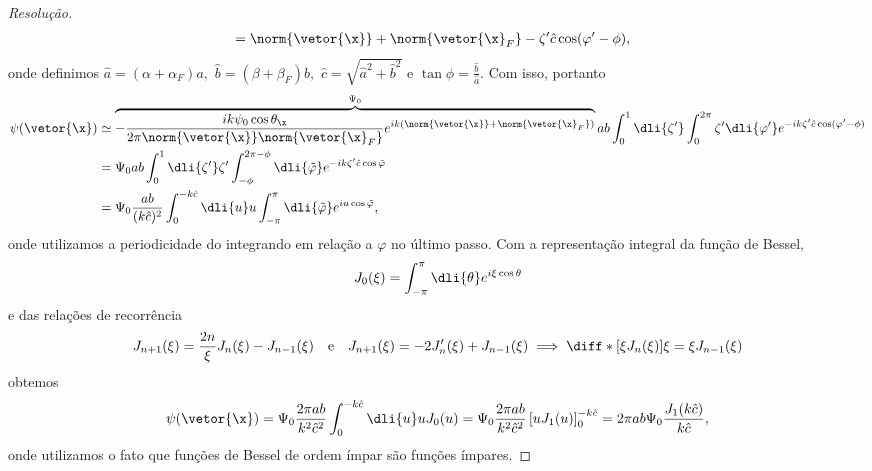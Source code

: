 \begin{proof}[Resolução]
\begin{align*}
                                                      &= \norm{\vetor{\x}} + \norm{\vetor{\x}_F} - \zeta' \hat{c} \cos(\varphi' - \phi),
    \end{align*}
    onde definimos \(\hat{a} = (\alpha + \alpha_F) a,\) \(\hat{b} = (\beta + \beta_F)b,\) \(\hat{c} = \sqrt{\hat{a}^2 + \hat{b}^2}\) e \(\tan\phi = \frac{\hat{b}}{\hat{a}}.\) Com isso,
    portanto
    \begin{align*}
        \psi(\vetor{\x}) &\simeq \overbrace{-\frac{ik \psi_0 \cos\theta_{\x}}{2\pi \norm{\vetor{\x}} \norm{\vetor{\x}_F}} e^{ik(\norm{\vetor{\x}} + \norm{\vetor{\x}_F})}}^{\Psi_0} ab\int_{0}^1 \dli{\zeta'} \int_{0}^{2\pi} \zeta' \dli{\varphi'} e^{-ik \zeta' \hat{c} \cos(\varphi' - \phi)}\\
                         &= \Psi_0 ab \int_0^1 \dli{\zeta'} \zeta' \int_{-\phi}^{2\pi - \phi} \dli{\tilde{\varphi}} e^{-ik \zeta' \hat{c} \cos\tilde{\varphi}}\\
                         &= \Psi_0 \frac{ab}{(k \hat{c})^2} \int_0^{-k \hat{c}} \dli{u} u \int_{-\pi}^\pi \dli{\tilde{\varphi}} e^{i u  \cos \tilde{\varphi}},
    \end{align*}
    onde utilizamos a periodicidade do integrando em relação a \(\varphi\) no último passo. Com a representação integral da função de Bessel,
    \begin{equation*}
        J_0(\xi) = \int_{-\pi}^\pi \dli{\theta} e^{i\xi \cos\theta}
    \end{equation*}
    e das relações de recorrência
    \begin{equation*}
        J_{n+1}(\xi) = \frac{2n}{\xi} J_n(\xi) - J_{n-1}(\xi)
        \quad\text{e}\quad
        J_{n+1}(\xi) = -2J'_n(\xi) + J_{n-1}(\xi) \implies \diff*{[\xi J_n(\xi)]}{\xi} = \xi J_{n - 1}(\xi)
    \end{equation*}
    obtemos
    \begin{equation*}
        \psi(\vetor{\x}) = \Psi_0 \frac{2\pi ab}{k^2 \hat{c}^2} \int_0^{-k \hat{c}} \dli{u} u J_0(u) = \Psi_0 \frac{2\pi ab}{k^2 \hat{c}^2} \left[u J_1(u)\right]_{0}^{-k \hat{c}} = 2\pi ab \Psi_0 \frac{J_1(k \hat{c})}{k \hat{c}},
    \end{equation*}
    onde utilizamos o fato que funções de Bessel de ordem ímpar são funções ímpares.
\end{proof}
